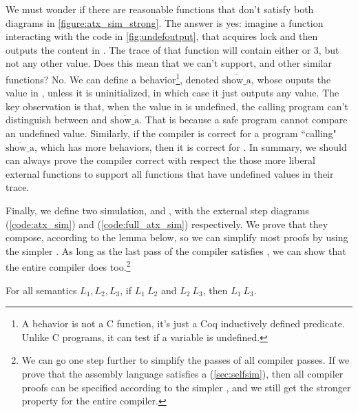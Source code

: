 We must wonder if there are reasonable functions that don't satisfy both diagrams in \cref{figure:atx_sim_strong}. The answer is yes: imagine a function  interacting with the code in \cref{fig:undefoutput}, that acquires lock  and then outputs the content in . The trace of that function will contain either  or $3$, but not any other value. Does this mean that we can't support,  and other similar functions? No. We can define a behavior\footnote{A behavior is not a C function, it's just a Coq inductively defined predicate. Unlike C programs, it can test if a variable is undefined.}, denoted $\overline{\text{show\_a}}$, whose ouputs the value in , unless it is uninitialized, in which case it just outputs any value. The key observation is that, when the value in  is undefined, the calling program can't distinguish between  and $\overline{\text{show\_a}}$. That is because a safe program cannot compare an undefined value. Similarly, if the compiler is correct for a program ``calling" $\overline{\text{show\_a}}$, which has more behaviors, then it is correct for . In summary, we should can always prove the compiler correct with respect the those more liberal external functions to support all functions that have undefined values in their trace.

Finally, we define two simulation,  and , with the external step diagrams  (\cref{code:atx_sim}) and  (\cref{code:full_atx_sim}) respectively. We prove that they compose, according to the lemma below, so we can simplify most proofs by using the simpler . As long as the last pass of the compiler satisfies , we can show that the entire compiler does too.\footnote{We can go one step further to simplify the passes of all compiler passes. If we prove that the assembly language satisfies a  (\cref{sec:selfsim}), then all compiler proofs can be specified according to the simpler , and we still get the stronger property for the entire compiler. }

\begin{lemma}\label{lemma:strinj_inj}
For all semantics $L_1, L_2, L_3$, if  $L_1 \ L_2$ and  $L_2 \ L_3$, then  $L_1 \ L_3$.
\end{lemma} 

